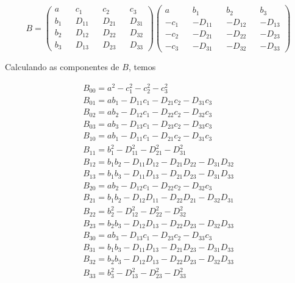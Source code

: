 \documentclass[10pt,a4paper]{article}
\begin{document}
\begin{equation}\nonumber
	B = \left(\begin{matrix}
	a && c_1 && c_2 && c_3 \\
	b_1 && D_{11} && D_{21} && D_{31}\\
	b_2 && D_{12} && D_{22} && D_{32} \\
	b_3 && D_{13} && D_{23} && D_{33}
\end{matrix}\right) \left(\begin{matrix}
a && b_1 && b_2 && b_3 \\
-c_1 && -D_{11} && -D_{12} && -D_{13} \\
-c_2 && -D_{21} && -D_{22} && -D_{23}\\
-c_3 && -D_{31} && -D_{32} && -D_{33}
\end{matrix}\right)
\end{equation}

Calculando as componentes de $ B $, temos

\begin{eqnarray}
	B_{00} = a^2 -c_1^2 - c_2^2 - c_3^2 \nonumber\\
	B_{01} = ab_1 - D_{11}c_1 - D_{21}c_2 - D_{31}c_3 \nonumber\\
	B_{02} = ab_2 - D_{12}c_1 - D_{22}c_2 - D_{32}c_3 \nonumber\\
	B_{03} = ab_3 - D_{13}c_1 - D_{23}c_2 - D_{33}c_3 \nonumber\\
	B_{10} = ab_1 - D_{11}c_1 - D_{21}c_2 - D_{31}c_3 \nonumber\\
	B_{11} = b_1^2 - D_{11}^2 - D_{21}^2 - D_{31}^2 \nonumber\\
	B_{12} = b_1b_2 - D_{11}D_{12} - D_{21}D_{22} - D_{31}D_{32} \nonumber\\
	B_{13} = b_1b_3 - D_{11}D_{13} - D_{21}D_{23} - D_{31}D_{33} \nonumber\\
	B_{20} = ab_2 - D_{12}c_1 - D_{22}c_2 - D_{32}c_3 \nonumber\\
	B_{21} = b_1b_2 - D_{12}D_{11} - D_{22}D_{21} - D_{32}D_{31} \nonumber\\
	B_{22} = b_2^2 - D_{12}^2 - D_{22}^2 - D_{32}^2 \nonumber\\
	B_{23} = b_2b_3 - D_{12}D_{13} - D_{22}D_{23} - D_{32}D_{33} \nonumber\\
	B_{30} = ab_3 - D_{13}c_1 - D_{23}c_2 - D_{33}c_3 \nonumber\\
	B_{31} = b_1b_3 - D_{11}D_{13} - D_{21}D_{23} - D_{31}D_{33} \nonumber\\
	B_{32} = b_2b_3 - D_{12}D_{13} - D_{22}D_{23} - D_{32}D_{33} \nonumber\\
	B_{33} = b_3^2 - D_{13}^2 - D_{23}^2 - D_{33}^2 \nonumber
\end{eqnarray}
\end{document}
